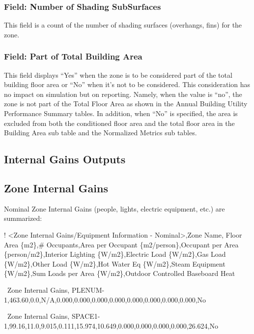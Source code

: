 \subsubsection{Field: Number of Shading SubSurfaces}\label{field-number-of-shading-subsurfaces}

This field is a count of the number of shading surfaces (overhangs, fins) for the zone.

\subsubsection{Field: Part of Total Building Area}\label{field-part-of-total-building-area}

This field displays ``Yes'' when the zone is to be considered part of the total building floor area or ``No'' when it's not to be considered. This consideration has no impact on simulation but on reporting. Namely, when the value is ``no'', the zone is not part of the Total Floor Area as shown in the Annual Building Utility Performance Summary tables. In addition, when ``No'' is specified, the area is excluded from both the conditioned floor area and the total floor area in the Building Area sub table and the Normalized Metrics sub tables.

\subsection{Internal Gains Outputs}\label{internal-gains-outputs}

\subsection{Zone Internal Gains}\label{zone-internal-gains}

Nominal Zone Internal Gains (people, lights, electric equipment, etc.) are summarized:

! \textless{}Zone Internal Gains/Equipment Information - Nominal\textgreater{},Zone Name, Floor Area \{m2\},\# Occupants,Area per Occupant \{m2/person\},Occupant per Area \{person/m2\},Interior Lighting \{W/m2\},Electric Load \{W/m2\},Gas Load \{W/m2\},Other Load \{W/m2\},Hot Water Eq \{W/m2\},Steam Equipment \{W/m2\},Sum Loads per Area \{W/m2\},Outdoor Controlled Baseboard Heat

~Zone Internal Gains, PLENUM-1,463.60,0.0,N/A,0.000,0.000,0.000,0.000,0.000,0.000,0.000,0.000,No

~Zone Internal Gains, SPACE1-1,99.16,11.0,9.015,0.111,15.974,10.649,0.000,0.000,0.000,0.000,26.624,No

